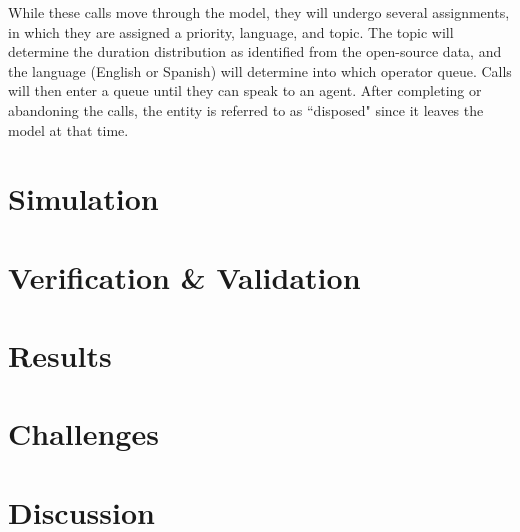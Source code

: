\documentclass[12pt,twocolumn]{article}
\begin{document}
While these calls move through the model, they will undergo several assignments, in which they are assigned a priority, language, and topic.  The topic will determine the duration distribution as identified from the open-source data, and the language (English or Spanish) will determine into which operator queue.  Calls will then enter a queue until they can speak to an agent.  After completing or abandoning the calls, the entity is referred to as ``disposed" since it leaves the model at that time.

\section{Simulation}



\section{Verification \& Validation}



\section{Results}



\section{Challenges}



\section{Discussion}
\end{document}
